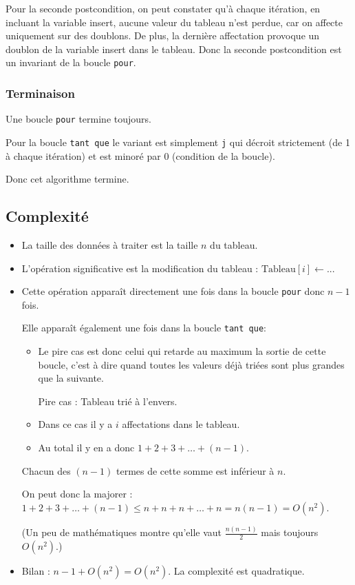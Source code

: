 \medskip

Pour la seconde postcondition, on peut constater qu'à chaque itération, en incluant la variable insert, aucune valeur du tableau n'est perdue, car on affecte uniquement sur des doublons. De plus, la dernière affectation provoque un doublon de la variable insert dans le tableau. Donc la seconde postcondition est un invariant de la boucle \texttt{pour}. 

\subsubsection{Terminaison}

Une boucle \texttt{pour} termine toujours.

Pour la boucle \texttt{tant que} le variant est simplement \texttt{j} qui décroit strictement (de 1 à chaque itération) et est minoré par 0 (condition de la boucle).

Donc cet algorithme termine.


\subsection{Complexité}

\begin{itemize}
	\item La taille des données à traiter est la taille $n$ du tableau.
	\item L'opération significative est la modification du tableau : $\text{Tableau}[i]\leftarrow...$
	\item Cette opération apparaît directement une fois dans la boucle \texttt{pour} donc $n-1$ fois.
	
	Elle apparaît également une fois dans la boucle \texttt{tant que}:
	
	\begin{itemize}
		\item Le pire cas est donc celui qui retarde au maximum la sortie de cette boucle, c'est à dire quand toutes les valeurs déjà triées sont plus grandes que la suivante.
		
		{\centering Pire cas : Tableau trié à l'envers.}
		\item Dans ce cas il y a $i$ affectations dans le tableau.
		\item Au total il y en a donc $1+2+3+\ldots+(n-1)$.
	\end{itemize}
	
	Chacun des $(n-1)$ termes de cette somme est inférieur à $n$.
	
	On peut donc la majorer : $1+2+3+\ldots+(n-1) \leqslant n+n+n+\ldots+n = n(n-1)=O(n^2)$.
	
	(Un peu de mathématiques montre qu'elle vaut $\frac{n(n-1)}{2}$ mais toujours $O(n^2)$.)
	
	\item Bilan : $n-1+O(n^2) = O(n^2)$. La  complexité est quadratique.
\end{itemize} 



